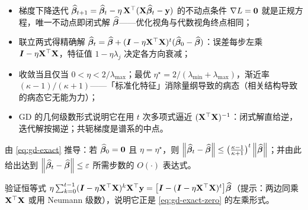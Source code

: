 \begin{keybox}[本章要点]
\begin{itemize}
  \item 梯度下降迭代 $\widehat{\bm{\beta}}_{t+1} = \widehat{\bm{\beta}}_t - \eta\,\mathbf{X}^\top(\mathbf{X}\widehat{\bm{\beta}}_t - \mathbf{y})$ 的不动点条件 $\nabla L = \mathbf{0}$ 就是正规方程，唯一不动点即闭式解 $\widehat{\bm{\beta}}$——优化视角与代数视角终点相同；
  \item 联立两式得精确解 $\widehat{\bm{\beta}}_t = \widehat{\bm{\beta}} + (\bm{I} - \eta\mathbf{X}^\top\mathbf{X})^t(\widehat{\bm{\beta}}_0 - \widehat{\bm{\beta}})$：误差每步左乘 $\bm{I} - \eta\mathbf{X}^\top\mathbf{X}$，特征值 $1 - \eta\lambda_j$ 决定各方向衰减；
  \item 收敛当且仅当 $0 < \eta < 2/\lambda_{\max}$；最优 $\eta^\star = 2/(\lambda_{\min} + \lambda_{\max})$，渐近率 $(\kappa - 1)/(\kappa + 1)$——「标准化特征」消除量纲导致的病态（相关结构导致的病态它无能为力）；
  \item GD 的几何级数形式说明它在用 $t$ 次多项式逼近 $(\mathbf{X}^\top\mathbf{X})^{-1}$：闭式解直给逆，迭代解按揭逆；共轭梯度是谱系的中点。
\end{itemize}
\end{keybox}

\begin{exercise}\label{ex:gd-rate}
由 \eqref{eq:gd-exact} 推导：若 $\widehat{\bm{\beta}}_0 = \mathbf{0}$ 且 $\eta = \eta^\star$，则 $\left\lVert \widehat{\bm{\beta}}_t - \widehat{\bm{\beta}} \right\rVert \le \big(\frac{\kappa-1}{\kappa+1}\big)^t \left\lVert \widehat{\bm{\beta}} \right\rVert$；并由此给出达到 $\left\lVert \widehat{\bm{\beta}}_t - \widehat{\bm{\beta}} \right\rVert \le \varepsilon$ 所需步数的 $O(\cdot)$ 表达式。
\end{exercise}

\begin{exercise}\label{ex:neumann}
验证恒等式 $\eta\sum_{k=0}^{t-1}(\bm{I} - \eta\mathbf{X}^\top\mathbf{X})^k \mathbf{X}^\top\mathbf{y} = \big[\bm{I} - (\bm{I} - \eta\mathbf{X}^\top\mathbf{X})^t\big]\widehat{\bm{\beta}}$（提示：两边同乘 $\mathbf{X}^\top\mathbf{X}$ 或用 Neumann 级数），说明它正是 \eqref{eq:gd-exact-zero} 的左乘形式。
\end{exercise}
